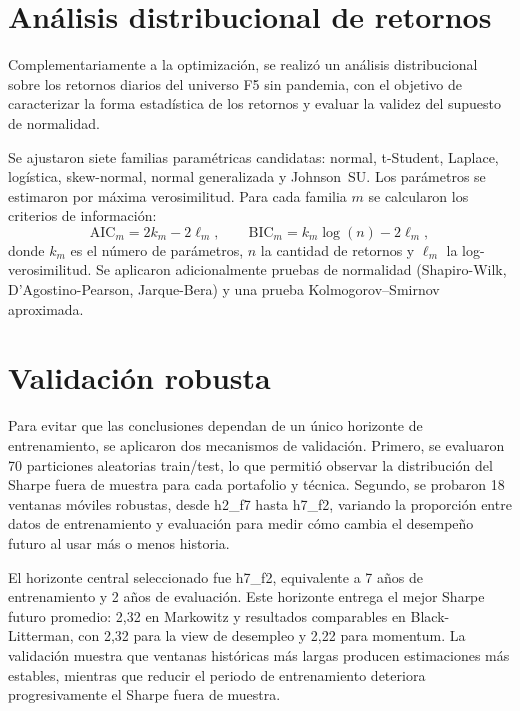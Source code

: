 \section{An\'alisis distribucional de retornos}

Complementariamente a la optimizaci\'on, se realiz\'o un an\'alisis
distribucional sobre los retornos diarios del universo F5 sin pandemia, con el
objetivo de caracterizar la forma estad\'istica de los retornos y evaluar la
validez del supuesto de normalidad.

Se ajustaron siete familias param\'etricas candidatas: normal, t-Student,
Laplace, log\'istica, skew-normal, normal generalizada y Johnson~SU. Los
par\'ametros se estimaron por m\'axima verosimilitud. Para cada familia $m$ se
calcularon los criterios de informaci\'on:
\begin{equation}
\text{AIC}_m = 2k_m - 2\ell_m, \qquad
\text{BIC}_m = k_m \log(n) - 2\ell_m,
\end{equation}
donde $k_m$ es el n\'umero de par\'ametros, $n$ la cantidad de retornos y
$\ell_m$ la log-verosimilitud. Se aplicaron adicionalmente pruebas de
normalidad (Shapiro-Wilk, D'Agostino-Pearson, Jarque-Bera) y una prueba
Kolmogorov--Smirnov aproximada.

\section{Validaci\'on robusta}

Para evitar que las conclusiones dependan de un \'unico horizonte de entrenamiento, se aplicaron dos mecanismos de validaci\'on. Primero, se evaluaron 70 particiones aleatorias train/test, lo que permiti\'o observar la distribuci\'on del Sharpe fuera de muestra para cada portafolio y t\'ecnica. Segundo, se probaron 18 ventanas m\'oviles robustas, desde h2\_f7 hasta h7\_f2, variando la proporci\'on entre datos de entrenamiento y evaluaci\'on para medir c\'omo cambia el desempe\~no futuro al usar m\'as o menos historia.

El horizonte central seleccionado fue h7\_f2, equivalente a 7 a\~nos de entrenamiento y 2 a\~nos de evaluaci\'on. Este horizonte entrega el mejor Sharpe futuro promedio: 2,32 en Markowitz y resultados comparables en Black-Litterman, con 2,32 para la view de desempleo y 2,22 para momentum. La validaci\'on muestra que ventanas hist\'oricas m\'as largas producen estimaciones m\'as estables, mientras que reducir el periodo de entrenamiento deteriora progresivamente el Sharpe fuera de muestra.

